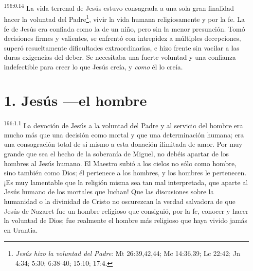 \par 
\textsuperscript{196:0.14} La vida terrenal de Jesús estuvo consagrada a una sola gran finalidad ---hacer la voluntad del Padre\footnote{\textit{Jesús hizo la voluntad del Padre}: Mt 26:39,42,44; Mc 14:36,39; Lc 22:42; Jn 4:34; 5:30; 6:38-40; 15:10; 17:4.}, vivir la vida humana religiosamente y por la fe. La fe de Jesús era confiada como la de un niño, pero sin la menor presunción. Tomó decisiones firmes y valientes, se enfrentó con intrepidez a múltiples decepciones, superó resueltamente dificultades extraordinarias, e hizo frente sin vacilar a las duras exigencias del deber. Se necesitaba una fuerte voluntad y una confianza indefectible para creer lo que Jesús creía, y \textit{como} él lo creía.

\section*{1. Jesús ---el hombre}
\par 
\textsuperscript{196:1.1} La devoción de Jesús a la voluntad del Padre y al servicio del hombre era mucho más que una decisión como mortal y que una determinación humana; era una consagración total de sí mismo a esta donación ilimitada de amor. Por muy grande que sea el hecho de la soberanía de Miguel, no debéis apartar de los hombres al Jesús humano. El Maestro subió a los cielos no sólo como hombre, sino también como Dios; él pertenece a los hombres, y los hombres le pertenecen. ¡Es muy lamentable que la religión misma sea tan mal interpretada, que aparte al Jesús humano de los mortales que luchan! Que las discusiones sobre la humanidad o la divinidad de Cristo no oscurezcan la verdad salvadora de que Jesús de Nazaret fue un hombre religioso que consiguió, por la fe, conocer y hacer la voluntad de Dios; fue realmente el hombre más religioso que haya vivido jamás en Urantia.

